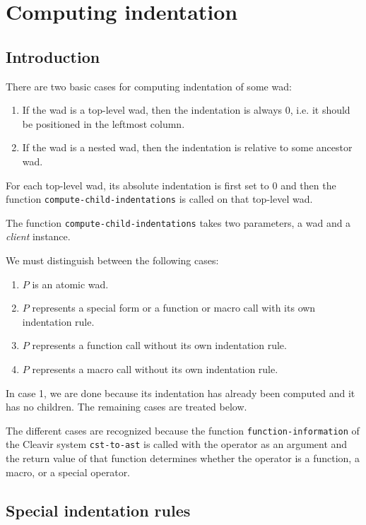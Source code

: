 \section{Computing indentation}
\label{sec-internals-common-lisp-mode-indentation}

\subsection{Introduction}

There are two basic cases for computing indentation of some wad:

\begin{enumerate}
\item If the wad is a top-level wad, then the
  indentation is always $0$, i.e. it should be positioned in the
  leftmost column.
\item If the wad is a nested wad, then the
  indentation is relative to some ancestor wad.
\end{enumerate}

For each top-level wad, its absolute indentation is first set
to $0$ and then the function \texttt{compute-child-indentations} is
called on that top-level wad.

The function \texttt{compute-child-indentations} takes two parameters,
a wad and a \emph{client} instance.

We must distinguish between the following cases:

\begin{enumerate}
\item $P$ is an atomic wad.
\item $P$ represents a special form or a function or macro call with
  its own indentation rule.
\item $P$ represents a function call without its own indentation rule.
\item $P$ represents a macro call without its own indentation rule.
\end{enumerate}

In case 1, we are done because its indentation has already been
computed and it has no children.  The remaining cases are treated
below.

The different cases are recognized because the function
\texttt{function-information} of the Cleavir system
\texttt{cst-to-ast} is called with the operator as an argument and the
return value of that function determines whether the operator is a
function, a macro, or a special operator.

\subsection{Special indentation rules}

